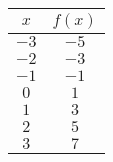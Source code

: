 \begin{tabular}{cc} \toprule
$x$  & $f(x)$ \\\midrule
$-3$ & $-5$   \\
$-2$ & $-3$   \\
$-1$ & $-1$   \\
$0$  & $1$    \\
$1$  & $3$    \\
$2$  & $5$    \\
$3$  & $7$    \\\bottomrule
\end{tabular}
